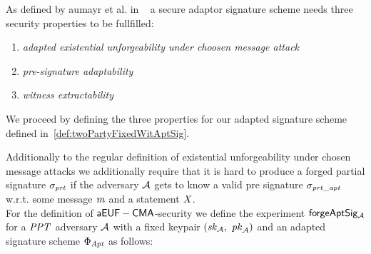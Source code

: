 As defined by aumayr et al. in ~\cite{aumayr2020bitcoinchannels} a secure adaptor signature scheme needs three security properties to be fullfilled:
\begin{enumerate}
    \item \textit{adapted existential unforgeability under choosen message attack}
    \item \textit{pre-signature adaptability}
    \item \textit{witness extractability}
\end{enumerate}

We proceed by defining the three properties for our adapted signature scheme defined in~\ref{def:twoPartyFixedWitAptSig}.

\begin{definition}[$\cnstaEUFCMA$]\label{def:aeufcma}
        Additionally to the regular definition of existential unforgeability under chosen message attacks we additionally require that it is hard to produce a forged partial signature $\sigma_{\mathit{prt}}$ if the
    adversary $\mathcal{A}$ gets to know a valid pre signature $\sigma_{\mathit{prt\_apt}}$ w.r.t. some message $\mathit{m}$ and a statement $\mathit{X}$.\\
    For the definition of $\cnstaEUFCMA$-security we define the experiment $\mathsf{forgeAptSig_{\mathcal{A}}}$ for a $\mathit{PPT}$ adversary $\mathcal{A}$ with a fixed keypair $(\mathit{sk}_{\mathcal{A}} ,~ \mathit{pk}_{\mathcal{A}})$ and an adapted signature scheme $\Phi_{\mathit{Apt}}$ as
    follows:\\
    \fbox{
        \parbox{\textwidth}{
            \procedure[linenumbering, syntaxhighlight=auto]{$\procExpForg{\varN}$} {
                \varSet \opAssign \cnstEmptySet \\
                (\varNonceAdv \opSeperate \varRandAdv) \opFunResult \procSetupPartSig{\varSecParam} \\
                \varMsg \opFunResult \cnstAdversary^{\procSignOracle{\cdot}{\varSecKey}{\varPubKey}}(\varPubKeyAdv \opSeperate \varRandAdv) \\
                \varSigPartApt \opFunResult \procGenPtAptSig{\varMsg}{\varSecKey}{\varNonce}{\varPubKeyAdv}{\varRandAdv}{\varWit} \\
                \varSigPart \opFunResult \cnstAdversary^{\procSignOracle{\cdot}{\varSecKey}{\varPubKey}}(\varSigPartApt) \\
                \varSigFin \opFunResult \procFinAptSig{\varSigPart}{\varSigPartApt}{\varWit}{\varRand}{\varRandAdv} \\
                \pcreturn (\varMsg \opNotIn \varSet \opAnd \procVerf{\varMsg}{\varSigFin}{\varPubKeyAdv \opAddPoint \varPubKey})
}}}
\end{definition}
